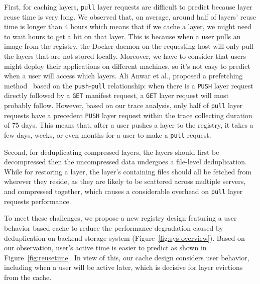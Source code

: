 First, for caching layers, \texttt{pull} layer requests are difficult to predict because layer reuse time is very long. 
We observed that, on average, around half of layers' reuse time is longer than 4 hours which means 
that if we cache a layer, we might need to wait hours to get a hit on that layer.
This is because when a user pulls an image from the registry, the Docker daemon on the requesting host will only pull the layers that are not stored locally. 
Moreover, we have to consider that users might deploy their applications on different machines, so it's not easy to predict 
when a user will access which layers.
Ali Anwar et al., proposed a prefetching method~\cite{dockerworkload} based on the \texttt{push}-\texttt{pull} relationship: 
when there is a \texttt{PUSH} layer request directly followed by a \texttt{GET} manifest request, a \texttt{GET} layer request will most probably follow.
However, based on our trace analysis, only half of \texttt{pull} layer requests have a precedent \texttt{PUSH} layer request within the trace collecting duration of 75 days. 
This means that,
after a user pushes a layer to the registry, it takes a few days, weeks, or even months for a user to make a \texttt{pull} request.

Second, for deduplicating compressed layers, 
the layers should first be decompressed then the uncompressed data undergoes a file-level deduplication. 
While for restoring a layer, the layer's containing files should all be fetched from wherever they reside, 
as they are likely to be scattered across multiple servers, 
and compressed together, which causes a considerable overhead on \texttt{pull} layer requests performance.

To meet these challenges, we propose a new registry design featuring a user behavior based cache to reduce the performance degradation caused by deduplication on backend storage system (Figure~\ref{fig:sys-overview}).
Based on our observation, user's active time is easier to predict as shown in Figure~\ref{fig:reusetime}.
In view of this, our cache design considers user behavior, including when a user will be active later, which is decisive for layer evictions from the cache.

